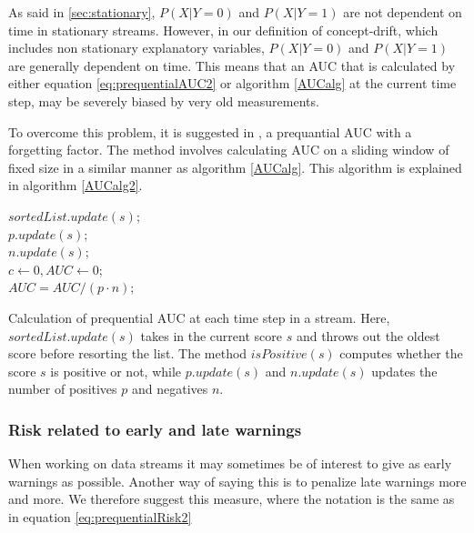 As said in \ref{sec:stationary}, $P(X | Y = 0)$ and $P(X | Y = 1)$ are not dependent on time in stationary streams. However, in our definition of concept-drift, which includes non stationary explanatory variables, $P(X | Y = 0)$ and $P(X | Y = 1)$ are generally dependent on time.  This means that an AUC that is calculated by either equation \eqref{eq:prequentialAUC2} or algorithm \ref{AUCalg} at the current time step, may be severely biased by very old measurements.

To overcome this problem, it is suggested in \cite{Brz14}, a prequantial AUC with a forgetting factor.  The method involves calculating AUC on a sliding window of fixed size in a similar manner as algorithm \ref{AUCalg}.  This algorithm is explained in algorithm \ref{AUCalg2}.

\begin{algorithm}[H]
$sortedList.update(s)$;\\
$p.update(s)$;\\
$n.update(s)$;\\
$c \leftarrow 0, AUC \leftarrow 0$;\\
$ AUC = AUC/(p \cdot n)$;
\label{AUCalg2}
 \caption{Calculation of prequential AUC at each time step in a stream.  Here, $sortedList.update(s)$ takes in the current score $s$ and throws out the oldest score before resorting the list. The method $isPositive(s)$ computes whether the score $s$ is positive or not, while $p.update(s)$ and $n.update(s)$ updates the number of positives $p$ and negatives $n$.}
\end{algorithm}


\subsubsection{Risk related to early and late warnings}

When working on data streams it may sometimes be of interest to give as early warnings as possible.  Another way of saying this is to penalize late warnings more and more.  We therefore suggest this measure, where the notation is the same as in equation \eqref{eq:prequentialRisk2}


